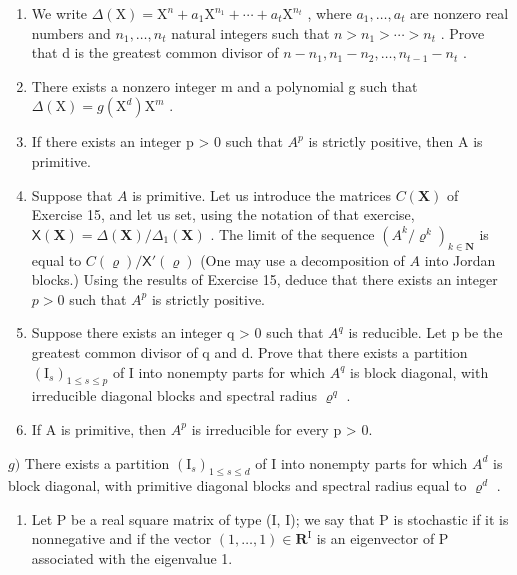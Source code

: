 \begin{enumerate}
\def\labelenumi{\alph{enumi})}
\item
  We write \(\Delta(\mathrm{X}) = \mathrm{X}^{n} + a_{1}\mathrm{X}^{n_{1}} + \cdots + a_{t}\mathrm{X}^{n_{t}}\) , where \(a_{1}, \ldots, a_{t}\) are nonzero real numbers and \(n_{1}, \ldots, n_{t}\) natural integers such that \(n > n_{1} > \cdots > n_{t}\) . Prove that d is the greatest common divisor of \(n - n_{1}, n_{1} - n_{2}, \ldots, n_{t-1} - n_{t}\) .
\item
  There exists a nonzero integer m and a polynomial g such that \(\Delta(\mathrm{X}) = g(\mathrm{X}^{d})\mathrm{X}^{m}\) .
\item
  If there exists an integer p \textgreater{} 0 such that \(A^{p}\) is strictly positive, then A is primitive.
\item
  Suppose that \(A\) is primitive. Let us introduce the matrices \(C(\mathbf{X})\) of Exercise 15, and let us set, using the notation of that exercise, \(\mathsf{X}(\mathbf{X}) = \Delta (\mathbf{X}) / \Delta_1(\mathbf{X})\) . The limit of the sequence \((A^k /\varrho^k)_{k\in \mathbf{N}}\) is equal to \(C(\varrho) / \mathsf{X}'(\varrho)\) (One may use a decomposition of \(A\) into Jordan blocks.) Using the results of Exercise 15, deduce that there exists an integer \(p > 0\) such that \(A^p\) is strictly positive.
\item
  Suppose there exists an integer q \textgreater{} 0 such that \(A^{q}\) is reducible. Let p be the greatest common divisor of q and d. Prove that there exists a partition \((\mathrm{I}_{s})_{1 \leqslant s \leqslant p}\) of I into nonempty parts for which \(A^{q}\) is block diagonal, with irreducible diagonal blocks and spectral radius \(\varrho^{q}\) .
\item
  If A is primitive, then \(A^{p}\) is irreducible for every p \textgreater{} 0.
\end{enumerate}

\(g)\) There exists a partition \((\mathrm{I}_s)_{1 \leqslant s \leqslant d}\) of I into nonempty parts for which \(A^d\) is block diagonal, with primitive diagonal blocks and spectral radius equal to \(\varrho^d\) .

\begin{enumerate}
\def\labelenumi{\arabic{enumi})}
\setcounter{enumi}{22}
\tightlist
\item
  Let P be a real square matrix of type (I, I); we say that P is stochastic if it is nonnegative and if the vector \((1, \ldots, 1) \in \mathbf{R}^{\mathrm{I}}\) is an eigenvector of P associated with the eigenvalue 1.
\end{enumerate}

